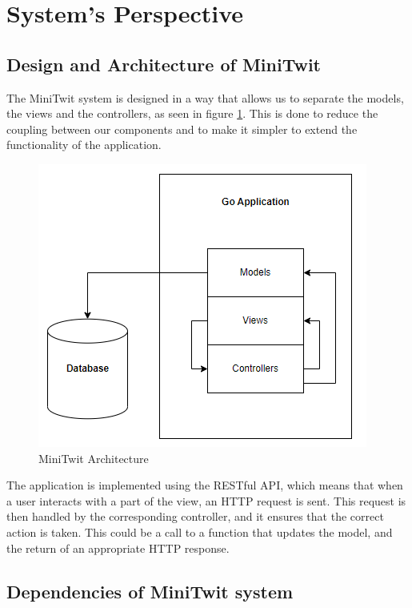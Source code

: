 \section{System's Perspective}

\subsection{Design and Architecture of MiniTwit}
The MiniTwit system is designed in a way that allows us to separate the models, the views and the controllers,
as seen in figure \ref{fig:minitwit}. This is done to reduce the coupling between our components and to make 
it simpler to extend the functionality of the application.  

\begin{figure}[H]
    \centering
    \captionsetup{justification=centering,margin=1cm}
    \includegraphics[width=0.8\linewidth]{report/images/system_architecture.png}
    \caption{MiniTwit Architecture}
    \label{fig:minitwit}
\end{figure}

The application is implemented using the RESTful API, which means that when a user interacts with a part of the 
view, an HTTP request is sent. This request is then handled by the corresponding controller, and it ensures 
that the correct action is taken. This could be a call to a function that updates the model, and the return of 
an appropriate HTTP response. 


\subsection{Dependencies of MiniTwit system}

